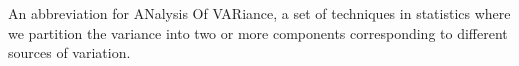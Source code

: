 An abbreviation for ANalysis Of VARiance, a set of techniques in statistics
where we partition the variance into two or more components corresponding to
different sources of variation.